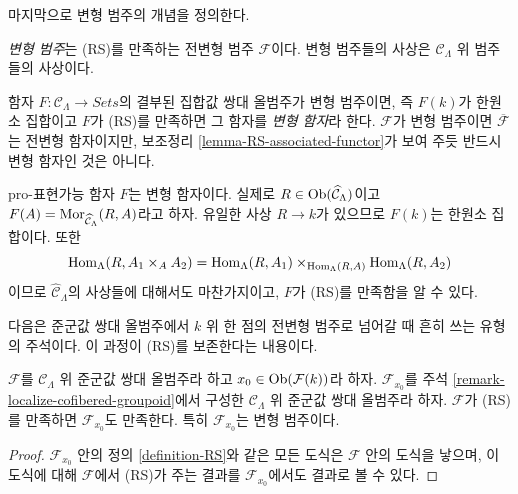 \noindent
마지막으로 변형 범주의 개념을 정의한다.

\begin{definition}
\label{definition-deformation-category}
{\it 변형 범주}는 (RS)를 만족하는 전변형 범주 $\mathcal{F}$이다.
변형 범주들의 사상은 $\mathcal{C}_\Lambda$ 위 범주들의 사상이다.
\end{definition}

\begin{remark}
\label{remark-deformation-functor}
함자 $F: \mathcal{C}_\Lambda \to \textit{Sets}$의 결부된
집합값 쌍대 올범주가 변형 범주이면, 즉 $F(k)$가 한원소 집합이고
$F$가 (RS)를 만족하면 그 함자를 {\it 변형 함자}라 한다.
$\mathcal{F}$가 변형 범주이면 $\overline{\mathcal{F}}$는
전변형 함자이지만, 보조정리
\ref{lemma-RS-associated-functor}가 보여 주듯 반드시 변형 함자인 것은 아니다.
\end{remark}

\begin{example}
\label{example-prorepresentable-deformation-functor}
pro-표현가능 함자 $F$는 변형 함자이다. 실제로
$R \in \mathop{\mathrm{Ob}}\nolimits(\widehat{\mathcal{C}}_\Lambda)$이고
$F(A) = \mathop{\mathrm{Mor}}\nolimits_{\widehat{\mathcal{C}}_\Lambda}(R, A)$라고 하자.
유일한 사상 $R \to k$가 있으므로 $F(k)$는 한원소 집합이다.
또한
$$
\mathop{\mathrm{Hom}}\nolimits_\Lambda(R, A_1 \times_A A_2) =
\mathop{\mathrm{Hom}}\nolimits_\Lambda(R, A_1) \times_{\mathop{\mathrm{Hom}}\nolimits_\Lambda(R, A)}
\mathop{\mathrm{Hom}}\nolimits_\Lambda(R, A_2)
$$
이므로 $\widehat{\mathcal{C}}_\Lambda$의 사상들에 대해서도 마찬가지이고,
$F$가 (RS)를 만족함을 알 수 있다.
\end{example}

\noindent
다음은 준군값 쌍대 올범주에서 $k$ 위 한 점의 전변형 범주로
넘어갈 때 흔히 쓰는 유형의 주석이다. 이 과정이 (RS)를 보존한다는
내용이다.

\begin{lemma}
\label{lemma-localize-RS}
$\mathcal{F}$를 $\mathcal{C}_\Lambda$ 위 준군값 쌍대 올범주라 하고
$x_0 \in \mathop{\mathrm{Ob}}\nolimits(\mathcal{F}(k))$라 하자.
$\mathcal{F}_{x_0}$를 주석
\ref{remark-localize-cofibered-groupoid}에서 구성한
$\mathcal{C}_\Lambda$ 위 준군값 쌍대 올범주라 하자.
$\mathcal{F}$가 (RS)를 만족하면 $\mathcal{F}_{x_0}$도 만족한다.
특히 $\mathcal{F}_{x_0}$는 변형 범주이다.
\end{lemma}

\begin{proof}
$\mathcal{F}_{x_0}$ 안의 정의 \ref{definition-RS}와 같은 모든 도식은
$\mathcal{F}$ 안의 도식을 낳으며, 이 도식에 대해
$\mathcal{F}$에서 (RS)가 주는 결과를
$\mathcal{F}_{x_0}$에서도 결과로 볼 수 있다.
\end{proof}

